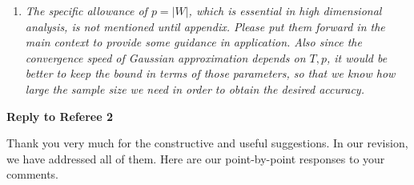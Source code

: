 \documentclass[a4paper,12pt]{article}
\begin{document}
\begin{enumerate}[label=(\arabic*),leftmargin=0.7cm]
\begin{enumerate}[label=(\roman*)]
As suggested, we have derived the power properties of the test against a certain class of local alternatives. Please see the new Corollary ?? in the Appendix of the paper. The proof is provided in the Supplementary Material.

\item \textit{The argument about no need for time dependent data is reasonable, just a short comment: there already exists result extending Chernozukov et al's GA to time dependent case, maybe this paper can be further extended to time dependent data as well.}
\end{enumerate}

\item \textit{The specific allowance of $p = |W|$, which is essential in high dimensional analysis, is not mentioned until appendix. Please put them forward in the main context to provide some guidance in application. Also since the convergence speed of Gaussian approximation depends on $T, p$, it would be better to keep the bound in terms of those parameters, so that we know how large the sample size we need in order to obtain the desired accuracy.}

\end{enumerate}



\newpage
\begin{center}
{\large \bf Reply to Referee 2} 
\end{center}


Thank you very much for the constructive and useful suggestions. In our revision, we have addressed all of them. Here are our point-by-point responses to your comments. 
\end{document}
